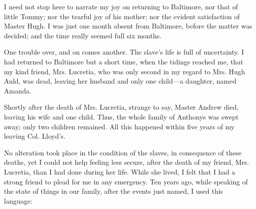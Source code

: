 I need not stop here to narrate my joy on returning to Baltimore, nor
that of little Tommy; nor the tearful joy of his mother; nor the evident
satisfaction of Master Hugh. I was just one month absent from Baltimore,
before the matter was decided; and the time really seemed full six
months.

One trouble over, and on comes another. The slave's life is full of
uncertainty. I had returned to Baltimore but a short time, when the
tidings reached me, that my kind friend, Mrs. Lucretia, who was only
second in my regard to Mrs. Hugh Auld, was dead, leaving her husband and
only one child---a daughter, named Amanda.

Shortly after the death of Mrs. Lucretia, strange to say, Master Andrew
died, leaving his wife and one child. Thus, the whole family of Anthonys
was swept away; only two children remained. All this happened within
five years of my leaving Col. Lloyd's.

No alteration took place in the condition of the slaves, in consequence
of these deaths, yet I could not help feeling less secure, after the
death of my friend, Mrs. Lucretia, than I had done during her life.
While she lived, I felt that I had a strong friend to plead for me in
any emergency. Ten years ago, while speaking of the state of things in
our family, after the events just named, I used this language:

